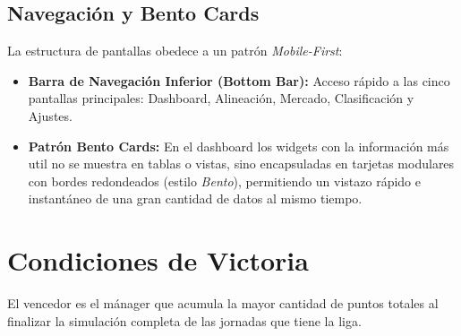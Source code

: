 \subsection{Navegación y Bento Cards}

La estructura de pantallas obedece a un patrón \textit{Mobile-First}:
\begin{itemize}
    \item \textbf{Barra de Navegación Inferior (Bottom Bar):} Acceso rápido a las cinco pantallas principales: Dashboard, Alineación, Mercado, Clasificación y Ajustes.
    \item \textbf{Patrón Bento Cards:} En el dashboard los widgets con la información más util no se muestra en tablas o vistas, sino encapsuladas en tarjetas modulares con bordes redondeados (estilo \textit{Bento}), permitiendo un vistazo rápido e instantáneo de una gran cantidad de datos al mismo tiempo.
\end{itemize}

\section{Condiciones de Victoria}
El vencedor es el mánager que acumula la mayor cantidad de puntos totales al finalizar la simulación completa de las jornadas que tiene la liga.